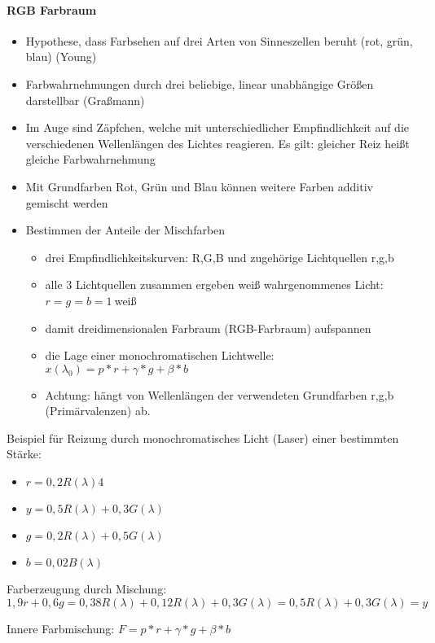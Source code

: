 \documentclass[10pt,landscape]{article}
\begin{document}
\begin{multicols}{3}
\paragraph{RGB Farbraum}
\begin{itemize}
  \item Hypothese, dass Farbsehen auf drei Arten von Sinneszellen beruht (rot, grün, blau) (Young)
  \item Farbwahrnehmungen durch drei beliebige, linear unabhängige Größen darstellbar (Graßmann)
  \item Im Auge sind Zäpfchen, welche mit unterschiedlicher Empfindlichkeit auf die verschiedenen Wellenlängen des Lichtes reagieren. Es gilt: gleicher Reiz heißt gleiche Farbwahrnehmung
  \item Mit Grundfarben Rot, Grün und Blau können weitere Farben additiv gemischt werden
  \item Bestimmen der Anteile der Mischfarben
        \begin{itemize}
          \item drei Empfindlichkeitskurven: R,G,B und zugehörige Lichtquellen r,g,b
          \item alle 3 Lichtquellen zusammen ergeben weiß wahrgenommenes Licht: $r=g=b=1~$weiß
          \item damit dreidimensionalen Farbraum (RGB-Farbraum) aufspannen
          \item die Lage einer monochromatischen Lichtwelle: $x(\lambda_0)=p*r+\gamma*g+\beta*b$
          \item Achtung: hängt von Wellenlängen der verwendeten Grundfarben r,g,b (Primärvalenzen) ab.
        \end{itemize}
\end{itemize}

Beispiel für Reizung durch monochromatisches Licht (Laser) einer bestimmten Stärke:
\begin{itemize}
  \item $r=0,2R(\lambda)4$
  \item $y=0,5R(\lambda)+0,3G(\lambda)$
  \item $g=0,2R(\lambda)+0,5G(\lambda)$
  \item $b=0,02B(\lambda)$
\end{itemize}

Farberzeugung durch Mischung:
$$1,9r + 0,6g = 0,38R(\lambda)+0,12R(\lambda)+0,3G(\lambda)=0,5R(\lambda)+0,3G(\lambda) = y$$


Innere Farbmischung: $F=p*r + \gamma*g + \beta*b$


\end{multicols}
\end{document}
